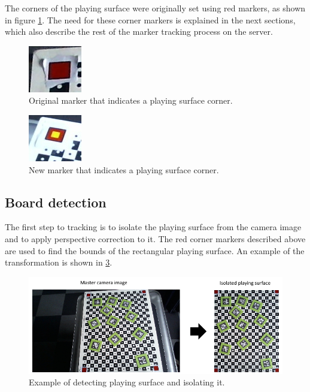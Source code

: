         The corners of the playing surface were originally set using red
        markers, as shown in figure \ref{fig:cornermarkers}. The need for these
        corner markers is explained in the next sections, which also describe
        the rest of the marker tracking process on the server.

        \begin{figure}[!ht]
            \centering
            \includegraphics{CornerMarker}
            \caption{Original marker that indicates a playing surface corner.}
            \label{fig:cornermarkers}
        \end{figure}

        \begin{figure}[!ht]
            \centering
            \includegraphics{CornerMarker2}
            \caption{New marker that indicates a playing surface corner.}
            \label{fig:cornermarkers2}
        \end{figure}

        \subsection{Board detection}
            The first step to tracking is to isolate the playing surface from
            the camera image and to apply perspective correction to it. The red
            corner markers described above are used to find the bounds of the
            rectangular playing surface. An example of the transformation is
            shown in \ref{fig:boarddetection}.

            \begin{figure}[!ht]
                \centering
                \includegraphics[width=\textwidth]{BoardDetection}
                \caption{Example of detecting playing surface and isolating it.}
                \label{fig:boarddetection}
            \end{figure}

